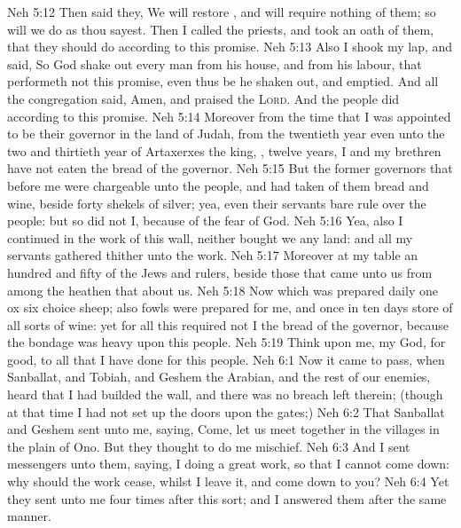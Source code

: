 \vs Neh 5:12 Then said they, We will restore , and will require nothing of them; so will we do as thou sayest. Then I called the priests, and took an oath of them, that they should do according to this promise.
\vs Neh 5:13 Also I shook my lap, and said, So God shake out every man from his house, and from his labour, that performeth not this promise, even thus be he shaken out, and emptied. And all the congregation said, Amen, and praised the \textsc{Lord}. And the people did according to this promise.
\vs Neh 5:14 Moreover from the time that I was appointed to be their governor in the land of Judah, from the twentieth year even unto the two and thirtieth year of Artaxerxes the king, , twelve years, I and my brethren have not eaten the bread of the governor.
\vs Neh 5:15 But the former governors that  before me were chargeable unto the people, and had taken of them bread and wine, beside forty shekels of silver; yea, even their servants bare rule over the people: but so did not I, because of the fear of God.
\vs Neh 5:16 Yea, also I continued in the work of this wall, neither bought we any land: and all my servants  gathered thither unto the work.
\vs Neh 5:17 Moreover  at my table an hundred and fifty of the Jews and rulers, beside those that came unto us from among the heathen that  about us.
\vs Neh 5:18 Now  which was prepared  daily  one ox  six choice sheep; also fowls were prepared for me, and once in ten days store of all sorts of wine: yet for all this required not I the bread of the governor, because the bondage was heavy upon this people.
\vs Neh 5:19 Think upon me, my God, for good,  to all that I have done for this people.
\vs Neh 6:1 Now it came to pass, when Sanballat, and Tobiah, and Geshem the Arabian, and the rest of our enemies, heard that I had builded the wall, and  there was no breach left therein; (though at that time I had not set up the doors upon the gates;)
\vs Neh 6:2 That Sanballat and Geshem sent unto me, saying, Come, let us meet together in  the villages in the plain of Ono. But they thought to do me mischief.
\vs Neh 6:3 And I sent messengers unto them, saying, I  doing a great work, so that I cannot come down: why should the work cease, whilst I leave it, and come down to you?
\vs Neh 6:4 Yet they sent unto me four times after this sort; and I answered them after the same manner.
